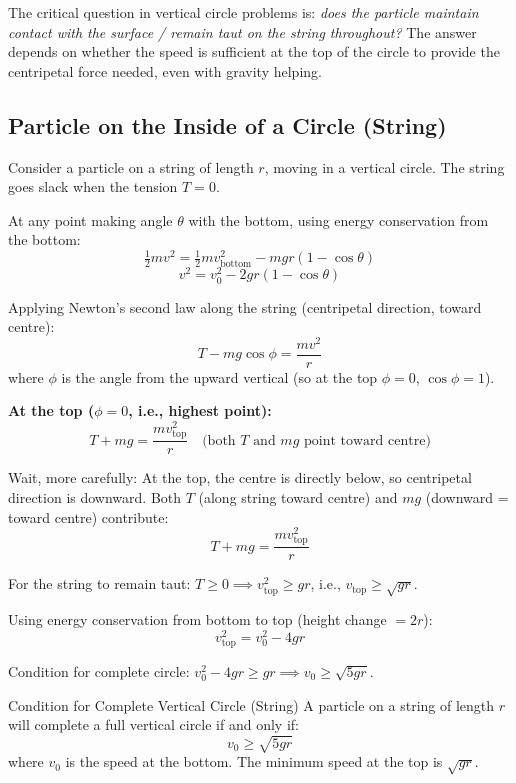 \documentclass[12pt, a4paper]{book}
\begin{document}
\begin{intuitionbox}
The critical question in vertical circle problems is: \emph{does the particle maintain contact with the surface / remain taut on the string throughout?} The answer depends on whether the speed is sufficient at the top of the circle to provide the centripetal force needed, even with gravity helping.
\end{intuitionbox}

\subsection{Particle on the Inside of a Circle (String)}

Consider a particle on a string of length $r$, moving in a vertical circle. The string goes slack when the tension $T = 0$.

At any point making angle $\theta$ with the bottom, using energy conservation from the bottom:
\[
  \tfrac{1}{2}mv^2 = \tfrac{1}{2}mv_{\text{bottom}}^2 - mgr(1 - \cos\theta)
\]
\[
  v^2 = v_0^2 - 2gr(1-\cos\theta)
\]

Applying Newton's second law along the string (centripetal direction, toward centre):
\[
  T - mg\cos\phi = \frac{mv^2}{r}
\]
where $\phi$ is the angle from the upward vertical (so at the top $\phi = 0$, $\cos\phi = 1$).

\textbf{At the top ($\phi = 0$, i.e., highest point):}
\[
  T + mg = \frac{mv_{\text{top}}^2}{r} \quad \text{(both $T$ and $mg$ point toward centre)}
\]

Wait, more carefully: At the top, the centre is directly below, so centripetal direction is downward. Both $T$ (along string toward centre) and $mg$ (downward = toward centre) contribute:
\[
  T + mg = \frac{mv_{\text{top}}^2}{r}
\]

For the string to remain taut: $T \geq 0 \implies v_{\text{top}}^2 \geq gr$, i.e., $v_{\text{top}} \geq \sqrt{gr}$.

Using energy conservation from bottom to top (height change $= 2r$):
\[
  v_{\text{top}}^2 = v_0^2 - 4gr
\]

Condition for complete circle: $v_0^2 - 4gr \geq gr \implies v_0 \geq \sqrt{5gr}$.

\begin{thm}{Condition for Complete Vertical Circle (String)}{}
A particle on a string of length $r$ will complete a full vertical circle if and only if:
\[
  v_0 \geq \sqrt{5gr}
\]
where $v_0$ is the speed at the bottom. The minimum speed at the top is $\sqrt{gr}$.
\end{thm}
\end{document}
